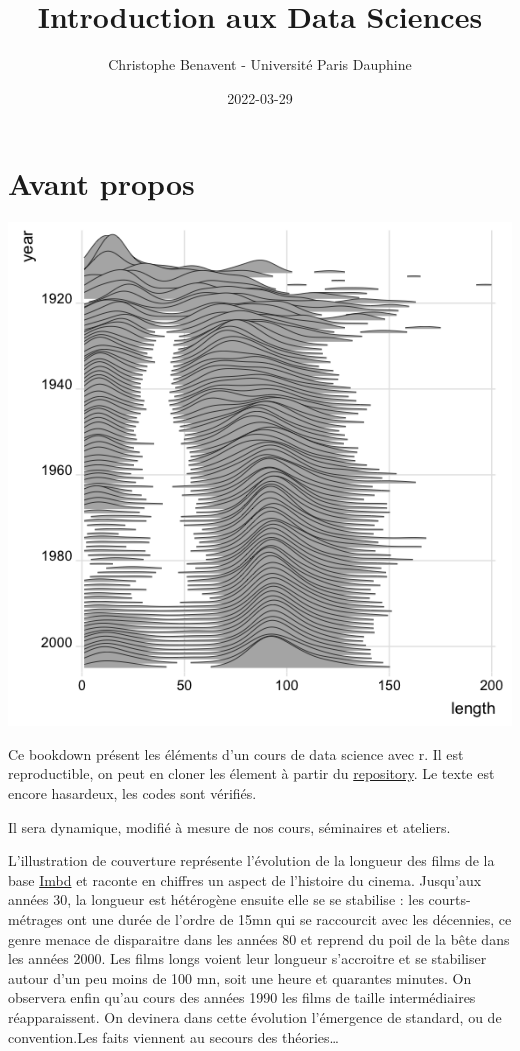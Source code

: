\documentclass[
]{book}
\title{Introduction aux Data Sciences}
\author{Christophe Benavent - Université Paris Dauphine}
\date{2022-03-29}
\begin{document}
\maketitle

{
\setcounter{tocdepth}{1}
\tableofcontents
}
\hypertarget{avant-propos}{%
\chapter{Avant propos}\label{avant-propos}}

\includegraphics{./Images/ggridge.png}

Ce bookdown présent les éléments d'un cours de data science avec r. Il est reproductible, on peut en cloner les élement à partir du \href{https://github.com/BenaventC/DataScienceBook}{repository}. Le texte est encore hasardeux, les codes sont vérifiés.

Il sera dynamique, modifié à mesure de nos cours, séminaires et ateliers.

L'illustration de couverture représente l'évolution de la longueur des films de la base \href{https://www.imdb.com/}{Imbd} et raconte en chiffres un aspect de l'histoire du cinema. Jusqu'aux années 30, la longueur est hétérogène ensuite elle se se stabilise : les courts-métrages ont une durée de l'ordre de 15mn qui se raccourcit avec les décennies, ce genre menace de disparaitre dans les années 80 et reprend du poil de la bête dans les années 2000. Les films longs voient leur longueur s'accroitre et se stabiliser autour d'un peu moins de 100 mn, soit une heure et quarantes minutes. On observera enfin qu'au cours des années 1990 les films de taille intermédiaires réapparaissent. On devinera dans cette évolution l'émergence de standard, ou de convention.Les faits viennent au secours des théories\ldots{}
\end{document}
